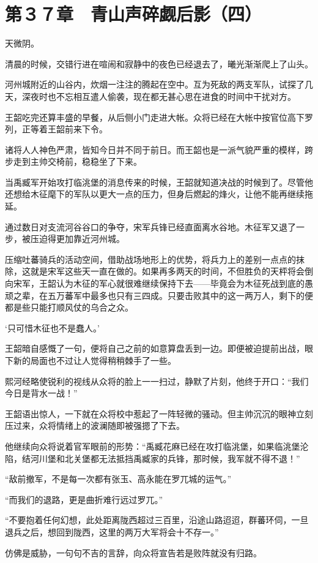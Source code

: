 \section{第３７章　青山声碎觑后影（四）}

天微阴。

清晨的时候，交错行进在喧闹和寂静中的夜色已经退去了，曦光渐渐爬上了山头。

河州城附近的山谷内，炊烟一注注的腾起在空中。互为死敌的两支军队，试探了几天，深夜时也不忘相互遣人偷袭，现在都无甚心思在进食的时间中干扰对方。

王韶吃完还算丰盛的早餐，从后侧小门走进大帐。众将已经在大帐中按官位高下罗列，正等着王韶前来下令。

诸将人人神色严肃，皆知今日并不同于前日。而王韶也是一派气貌严重的模样，跨步走到主帅交椅前，稳稳坐了下来。

当禹臧军开始攻打临洮堡的消息传来的时候，王韶就知道决战的时候到了。尽管他还想给木征麾下的军队以更大一点的压力，但身后燃起的烽火，让他不能再继续拖延。

通过数日对支流河谷谷口的争夺，宋军兵锋已经直面离水谷地。木征军又退了一步，被压迫得更加靠近河州城。

压缩吐蕃骑兵的活动空间，借助战场地形上的优势，将兵力上的差别一点点的抹除，这就是宋军这些天一直在做的。如果再多两天的时间，不但胜负的天枰将会倒向宋军，王韶认为木征的军心就很难继续保持下去——毕竟会为木征死战到底的愚顽之辈，在五万蕃军中最多也只有三四成。只要击败其中的这一两万人，剩下的便都是些只能打顺风仗的乌合之众。

‘只可惜木征也不是蠢人。’

王韶暗自感慨了一句，便将自己之前的如意算盘丢到一边。即便被迫提前出战，眼下新的局面也不过让人觉得稍稍棘手了一些。

熙河经略使锐利的视线从众将的脸上一一扫过，静默了片刻，他终于开口：“我们今日是背水一战！”

王韶语出惊人，一下就在众将校中惹起了一阵轻微的骚动。但主帅沉沉的眼神立刻压过来，众将情绪上的波澜随即被强摁了下去。

他继续向众将说着官军眼前的形势：“禹臧花麻已经在攻打临洮堡，如果临洮堡沦陷，结河川堡和北关堡都无法抵挡禹臧家的兵锋，那时候，我军就不得不退！”

“敌前撤军，不是每一次都有张玉、高永能在罗兀城的运气。”

“而我们的退路，更是曲折难行远过罗兀。”

“不要抱着任何幻想，此处距离陇西超过三百里，沿途山路迢迢，群蕃环伺，一旦退兵之后，想回到陇西，这里的两万大军将会十不存一。”

仿佛是威胁，一句句不吉的言辞，向众将宣告若是败阵就没有归路。

